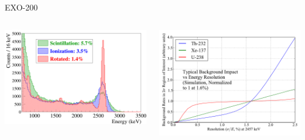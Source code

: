 \documentclass[final]{beamer} %
\begin{document}
\begin{frame}{}
\begin{columns}[t]
\begin{column}{.3\linewidth}
\begin{block}{\large EXO-200}
      \begin{columns}
        \begin{column}{0.49\linewidth}
          \includegraphics[keepaspectratio=true,width=\textwidth]{RotationTh2D_ImprovementInResolution.png}
        \end{column}
        \begin{column}{0.49\linewidth}
          \includegraphics[keepaspectratio=true,width=\textwidth]{BackgroundsVsRes.pdf}
        \end{column}
      \end{columns}

    \end{block}


\end{column}
\end{columns}
\end{frame}
\end{document}
